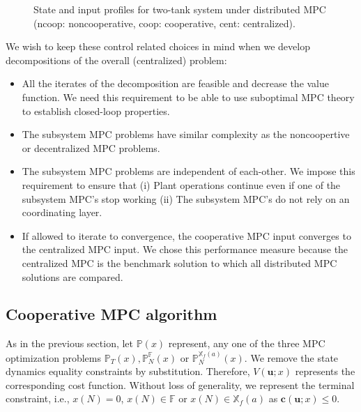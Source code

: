 \documentclass[10pt, twocolumn]{article}
\newcommand{\bu}{\mathbf{u}}
\theoremstyle{definition}
\begin{document}
\begin{figure*}
\centering
\scriptsize
\resizebox{\textwidth}{!}{}
\resizebox{\textwidth}{!}{}
\resizebox{\textwidth}{!}{}
\caption{State and input profiles for two-tank system under
  distributed MPC (ncoop: noncooperative, coop: cooperative, cent: centralized).}
\label{fig:unstable}
\end{figure*}
We  wish to keep these control related choices in mind when we develop decompositions of the overall (centralized) problem:
\begin{itemize}
\item All the iterates of the decomposition are feasible and decrease the value function. We need this requirement to be able to use suboptimal MPC theory to establish closed-loop properties.
\item The subsystem MPC problems have similar complexity as the noncoopertive or decentralized MPC problems. 
\item The subsystem MPC problems are independent of each-other. We impose this requirement to ensure that (i) Plant operations continue even if one of the subsystem MPC's stop working  (ii) The subsystem MPC's do not rely on an coordinating layer.
\item If allowed to iterate to convergence, the cooperative MPC input converges to the centralized MPC input. We chose this performance measure because the centralized MPC is the benchmark solution to which all distributed MPC solutions are compared. 
\end{itemize}

\subsection{Cooperative MPC algorithm}
As in the previous section, let  $\mathbb{P}(x)$ represent, any one of the three MPC optimization problems $\mathbb{P}_T(x),\mathbb{P}_N^{\mathbb{F}}(x)$ or $\mathbb{P}_N^{\mathbb{X}_f(a)}(x)$. We remove the state dynamics equality constraints by substitution.  Therefore,  $V(\bu;x)$ represents the corresponding cost function. Without loss of generality, we represent the terminal constraint, i.e., $x(N) = 0$, $x(N) \in \mathbb{F}$ or $x(N) \in \mathbb{X}_f(a)$ as $\mathbf{c}(\bu;x) \leq 0$. 
\end{document}
